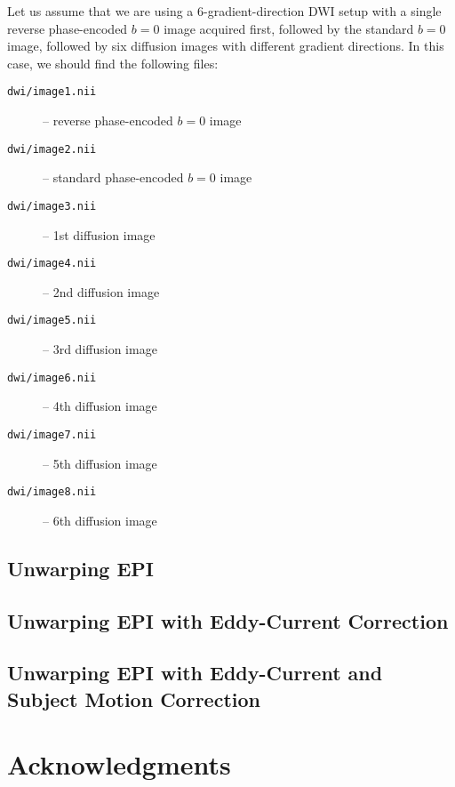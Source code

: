 \documentclass{InsightArticle}
\begin{document}
Let us assume that we are using a 6-gradient-direction DWI setup with a single
reverse phase-encoded $b=0$ image acquired first, followed by the standard
$b=0$ image, followed by six diffusion images with different gradient
directions. In this case, we should find the following files:
\begin{description}
\item[\tt dwi/image1.nii] -- reverse phase-encoded $b=0$ image
\item[\tt dwi/image2.nii] -- standard phase-encoded $b=0$ image
\item[\tt dwi/image3.nii] -- 1st diffusion image
\item[\tt dwi/image4.nii] -- 2nd diffusion image
\item[\tt dwi/image5.nii] -- 3rd diffusion image
\item[\tt dwi/image6.nii] -- 4th diffusion image
\item[\tt dwi/image7.nii] -- 5th diffusion image
\item[\tt dwi/image8.nii] -- 6th diffusion image
\end{description}

\subsection{Unwarping EPI}

\subsection{Unwarping EPI with Eddy-Current Correction}

\subsection{Unwarping EPI with Eddy-Current and Subject Motion Correction}

\section*{Acknowledgments}



\end{document}
